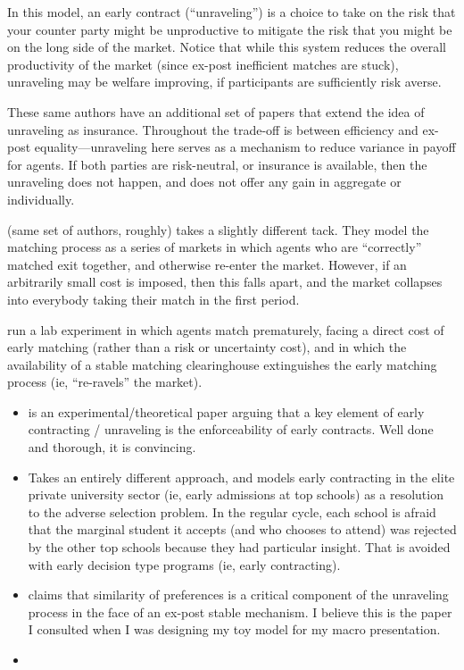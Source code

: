 \documentclass[WP]{AEA}
\begin{document}
In this model, an early contract (``unraveling'')  is a choice to take on the risk that your counter party might be unproductive to mitigate the risk that you might be on the long side of the market.  Notice that while this system reduces the overall productivity of the market (since ex-post inefficient matches are stuck), unraveling may be welfare improving, if participants are sufficiently risk averse.

These same authors have an additional set of papers \cite{Li2000,Li2004}  that extend the idea of unraveling as insurance.  Throughout the trade-off is between efficiency and ex-post equality—unraveling here serves as a mechanism to reduce variance in payoff for agents.  If both parties are risk-neutral, or insurance is available, then the unraveling does not happen, and does not offer any gain in aggregate or individually.


\cite{Damiano2005} (same set of authors, roughly) takes a slightly different tack.  They model the matching process as a series of markets in which agents who are “correctly” matched exit together, and otherwise re-enter the market.  However, if an arbitrarily small cost is imposed, then this falls apart, and the market collapses into everybody taking their match in the first period. 


\cite{Kagel2000} run a lab experiment in which agents match prematurely, facing a direct cost of early matching (rather than a risk or uncertainty cost), and in which the availability of a stable matching clearinghouse extinguishes the early matching process (ie, “re-ravels” the market).
\begin{itemize}
	\item \cite{Niederle2004} is an experimental/theoretical paper arguing that a key element of early contracting / unraveling is the enforceability of early contracts.  Well done and thorough, it is convincing.
	\item   \cite{Lee2009}Takes an entirely different approach, and models early contracting in the elite private university sector (ie, early admissions at top schools) as a resolution to the adverse selection problem.  In the regular cycle, each school is afraid that the marginal student it accepts (and who chooses to attend) was rejected by the other top schools because they had particular insight.  That is avoided with early decision type programs (ie, early contracting).
	\item  \cite{Halaburda2010} claims that similarity of preferences is a critical component of the unraveling process in the face of an ex-post stable mechanism.  I believe this is the paper I consulted when I was designing my toy model for my macro presentation.  
	\item 
\end{itemize}
\end{document}
